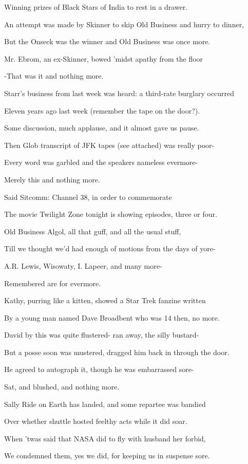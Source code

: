\documentclass[12pt]{article}
\begin{document}
Winning prizes of Black Stars of India to rest in a drawer.

An attempt was made by Skinner to skip Old Business and hurry to dinner,

But the Onseck was the winner and Old Business was once more.

Mr. Ebrom, an ex-Skinner, bowed 'midst apathy from the floor

-That was it and nothing more.

Starr's business from last week was heard: a third-rate burglary occurred

Eleven years ago last week (remember the tape on the door?).

Some discussion, much applause, and it almost gave us pause.

Then Glob transcript of JFK tapes (see attached) was really poor-

Every word was garbled and the speakers nameless evermore-

Merely this and nothing more.

Said Sitcomm: Channel 38, in order to commemorate

The movie Twilight Zone tonight is showing episodes, three or four.

Old Business Algol, all that guff, and all the usual stuff,

Till we thought we'd had enough of motions from the days of yore-

A.R. Lewis, Wisowaty, I. Lapeer, and many more-

Remembered are for evermore.

Kathy, purring like a kitten, showed a Star Trek fanzine written

By a young man named Dave Broadbent who was 14 then, no more.

David by this was quite flustered- ran away, the silly bustard-

But a posse soon was mustered, dragged him back in through the door.

He agreed to autograph it, though he was embarrassed sore-

Sat, and blushed, and nothing more.

Sally Ride on Earth has landed, and some repartee was bandied

Over whether shuttle hosted feelthy acts while it did soar.

When 'twas said that NASA did to fly with husband her forbid,

We condemned them, yes we did, for keeping us in suspense sore.
\end{document}
